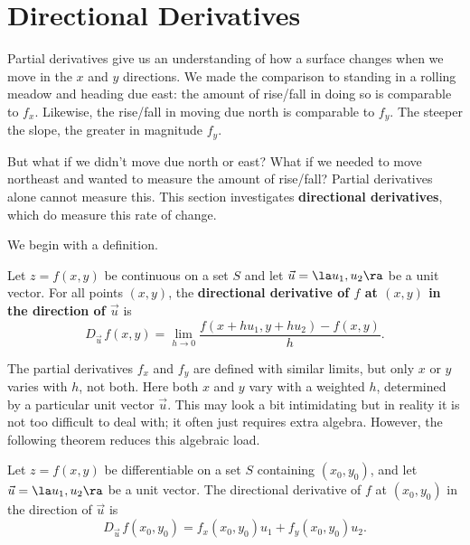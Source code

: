 \section{Directional Derivatives}\label{sec:directional_derivative}

Partial derivatives give us an understanding of how a surface changes when we move in the $x$ and $y$ directions. We made the comparison to standing in a rolling meadow and heading due east: the amount of rise/fall in doing so is comparable to $f_x$. Likewise, the rise/fall in  moving due north is comparable to $f_y$. The steeper the slope, the greater in magnitude $f_y$.

But what if we didn't move due north or east? What if we needed to move northeast and wanted to measure the amount of rise/fall? Partial derivatives alone cannot measure this. This section investigates \textbf{directional derivatives}, which do measure this rate of change. 

We begin with a definition.

{Let $z=f(x,y)$ be continuous on a set $S$ and let $\vec u = \la u_1,u_2\ra$ be a unit vector. For all points $(x,y)$, the \textbf{directional derivative of $f$ at $(x,y)$ in the direction of $\vec u$} is
$$D_{\vec u\,}f(x,y) = \lim_{h\to 0} \frac{f(x+hu_1,y+hu_2) - f(x,y)}h.$$
}

The partial derivatives $f_x$ and $f_y$ are defined with similar limits, but only $x$ or $y$ varies with $h$, not both. Here both $x$ and $y$ vary with a weighted $h$, determined by a particular unit vector $\vec u$. This may look a bit intimidating but in reality it is not too difficult to deal with; it often just requires extra algebra. However, the following theorem reduces this algebraic load.

\enlargethispage{2\baselineskip}

{Let $z=f(x,y)$ be differentiable on a set $S$ containing $(x_0,y_0)$, and let $\vec u = \la u_1,u_2\ra$ be a unit vector. The directional derivative of $f$ at $(x_0,y_0)$ in the direction of $\vec u$ is
$$D_{\vec u\,}f(x_0,y_0)=f_x(x_0,y_0)u_1 + f_y(x_0,y_0)u_2.$$
}

